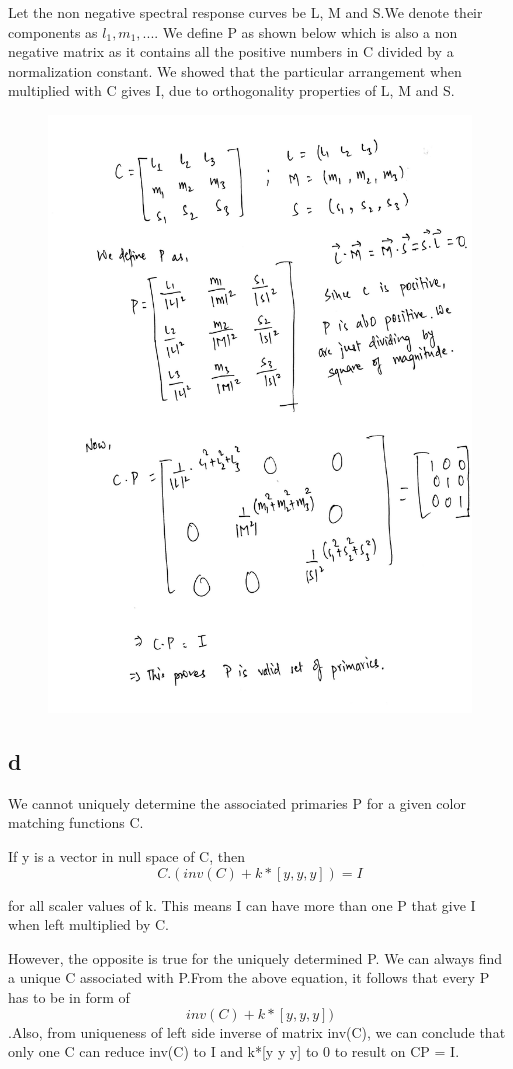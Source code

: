 \documentclass[12pt,letterpaper]{article}
\begin{document}
Let the non negative spectral response curves be L, M and S.We denote their components as $l_{1}, m_{1}, ... $. We define P as shown below which is also a non negative matrix as it contains all the positive numbers in C divided by a normalization constant. We showed that the particular arrangement when multiplied with C gives I, due to orthogonality properties of L, M and S.   
\begin{figure}[htbp]
	\includegraphics[width=\textwidth]{2c.pdf}
\end{figure}


\subsection*{d}

We cannot uniquely determine the  associated primaries P for a given color matching functions C. 

If y is a vector in null space of C, then \[        C .(inv(C) + k * [y, y, y]) = I         \]

        
 for all scaler values of k. This means I can have more than one P that give I when left multiplied by C. 

However, the opposite is true for the uniquely determined P. We can always find a unique C associated with P.From the above equation, it follows that every P has to be in form of 
\[   inv(C) + k * [y, y, y])  \] 
.Also, from uniqueness of left side inverse of matrix  inv(C), we can conclude that only one C can reduce inv(C) to I and k*[y y y] to 0 to result on CP = I.
\end{document}
